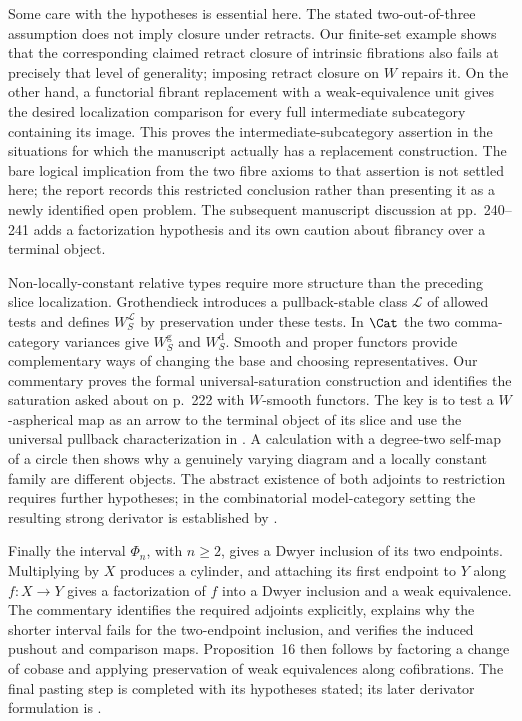Some care with the hypotheses is essential here. The stated two-out-of-three assumption does not imply closure under retracts. Our finite-set example shows that the corresponding claimed retract closure of intrinsic fibrations also fails at precisely that level of generality; imposing retract closure on $W$ repairs it. On the other hand, a functorial fibrant replacement with a weak-equivalence unit gives the desired localization comparison for every full intermediate subcategory containing its image. This proves the intermediate-subcategory assertion in the situations for which the manuscript actually has a replacement construction. The bare logical implication from the two fibre axioms to that assertion is not settled here; the report records this restricted conclusion rather than presenting it as a newly identified open problem. The subsequent manuscript discussion at pp.~240--241 adds a factorization hypothesis and its own caution about fibrancy over a terminal object.

Non-locally-constant relative types require more structure than the preceding slice localization. Grothendieck introduces a pullback-stable class $\mathcal L$ of allowed tests and defines $W_S^{\mathcal L}$ by preservation under these tests. In $\Cat$ the two comma-category variances give $W_S^{\mathrm g}$ and $W_S^{\mathrm d}$. Smooth and proper functors provide complementary ways of changing the base and choosing representatives. Our commentary proves the formal universal-saturation construction and identifies the saturation asked about on p.~222 with $W$-smooth functors. The key is to test a $W$-aspherical map as an arrow to the terminal object of its slice and use the universal pullback characterization in \citet[Theorem~1.2(c)]{Maltsiniotis2005Asphericite}. A calculation with a degree-two self-map of a circle then shows why a genuinely varying diagram and a locally constant family are different objects. The abstract existence of both adjoints to restriction requires further hypotheses; in the combinatorial model-category setting the resulting strong derivator is established by \citet[Proposition~1.30]{Groth2013}.

Finally the interval $\Phi_n$, with $n\geq2$, gives a Dwyer inclusion of its two endpoints. Multiplying by $X$ produces a cylinder, and attaching its first endpoint to $Y$ along $f:X\to Y$ gives a factorization of $f$ into a Dwyer inclusion and a weak equivalence. The commentary identifies the required adjoints explicitly, explains why the shorter interval fails for the two-endpoint inclusion, and verifies the induced pushout and comparison maps. Proposition~16 then follows by factoring a change of cobase and applying preservation of weak equivalences along cofibrations. The final pasting step is completed with its hypotheses stated; its later derivator formulation is \citet[Proposition~3.13]{Groth2013}.

